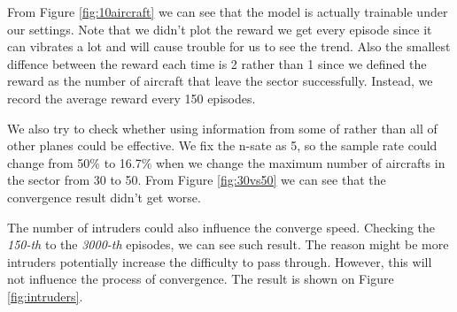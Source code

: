 From Figure \ref{fig:10aircraft} we can see that the model is actually trainable under our settings. Note that we didn't plot the reward we get every episode since it can vibrates a lot and will cause trouble for us to see the trend. Also the smallest diffence between the reward each time is 2 rather than 1 since we defined the reward as the number of aircraft that leave the sector successfully. Instead, we record the average reward every 150 episodes.

We also try to check whether using information from some of rather than all of other planes could be effective. We fix the n-sate as 5, so the sample rate could change from 50\% to 16.7\% when we change the maximum number of aircrafts in the sector from 30 to 50. From Figure \ref{fig:30vs50} we can see that the convergence result didn't get worse.

The number of intruders could also influence the converge speed. Checking the \textit{150-th} to the \textit{3000-th} episodes, we can see such result. The reason might be more intruders potentially increase the difficulty to pass through. However, this will not influence the process of convergence. The result is shown on Figure \ref{fig:intruders}.